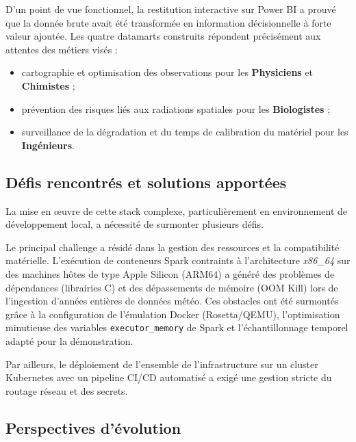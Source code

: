 \documentclass[11pt,a4paper]{article}
\begin{document}
D'un point de vue fonctionnel, la restitution interactive sur Power BI a prouvé que la donnée brute avait été transformée en information décisionnelle à forte valeur ajoutée. Les quatre datamarts construits répondent précisément aux attentes des métiers visés :
\begin{itemize}
    \item cartographie et optimisation des observations pour les \textbf{Physiciens} et \textbf{Chimistes} ;
    \item prévention des risques liés aux radiations spatiales pour les \textbf{Biologistes} ;
    \item surveillance de la dégradation et du temps de calibration du matériel pour les \textbf{Ingénieurs}.
\end{itemize}

\subsection{Défis rencontrés et solutions apportées}

La mise en œuvre de cette stack complexe, particulièrement en environnement de développement local, a nécessité de surmonter plusieurs défis. 

Le principal challenge a résidé dans la gestion des ressources et la compatibilité matérielle. L'exécution de conteneurs Spark contraints à l'architecture \textit{x86\_64} sur des machines hôtes de type Apple Silicon (ARM64) a généré des problèmes de dépendances (librairies C) et des dépassements de mémoire (OOM Kill) lors de l'ingestion d'années entières de données météo. Ces obstacles ont été surmontés grâce à la configuration de l'émulation Docker (Rosetta/QEMU), l'optimisation minutieuse des variables \texttt{executor\_memory} de Spark et l'échantillonnage temporel adapté pour la démonstration. 

Par ailleurs, le déploiement de l'ensemble de l'infrastructure sur un cluster Kubernetes avec un pipeline CI/CD automatisé a exigé une gestion stricte du routage réseau et des secrets.

\subsection{Perspectives d'évolution}
\end{document}
